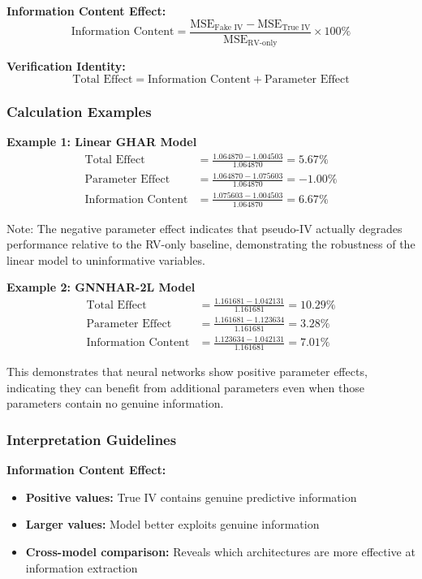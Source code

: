 \documentclass[12pt,a4paper]{article}
\begin{document}
\textbf{Information Content Effect:}
$$\text{Information Content} = \frac{\text{MSE}_{\text{Fake IV}} - \text{MSE}_{\text{True IV}}}{\text{MSE}_{\text{RV-only}}} \times 100\%$$

\textbf{Verification Identity:}
$$\text{Total Effect} = \text{Information Content} + \text{Parameter Effect}$$

\subsubsection{Calculation Examples}

\textbf{Example 1: Linear GHAR Model}
\begin{align}
\text{Total Effect} &= \frac{1.064870 - 1.004503}{1.064870} = 5.67\% \\
\text{Parameter Effect} &= \frac{1.064870 - 1.075603}{1.064870} = -1.00\% \\
\text{Information Content} &= \frac{1.075603 - 1.004503}{1.064870} = 6.67\%
\end{align}

Note: The negative parameter effect indicates that pseudo-IV actually degrades performance relative to the RV-only baseline, demonstrating the robustness of the linear model to uninformative variables.

\textbf{Example 2: GNNHAR-2L Model}
\begin{align}
\text{Total Effect} &= \frac{1.161681 - 1.042131}{1.161681} = 10.29\% \\
\text{Parameter Effect} &= \frac{1.161681 - 1.123634}{1.161681} = 3.28\% \\
\text{Information Content} &= \frac{1.123634 - 1.042131}{1.161681} = 7.01\%
\end{align}

This demonstrates that neural networks show positive parameter effects, indicating they can benefit from additional parameters even when those parameters contain no genuine information.

\subsubsection{Interpretation Guidelines}

\textbf{Information Content Effect:}
\begin{itemize}
\item \textbf{Positive values:} True IV contains genuine predictive information
\item \textbf{Larger values:} Model better exploits genuine information
\item \textbf{Cross-model comparison:} Reveals which architectures are more effective at information extraction
\end{itemize}
\end{document}
